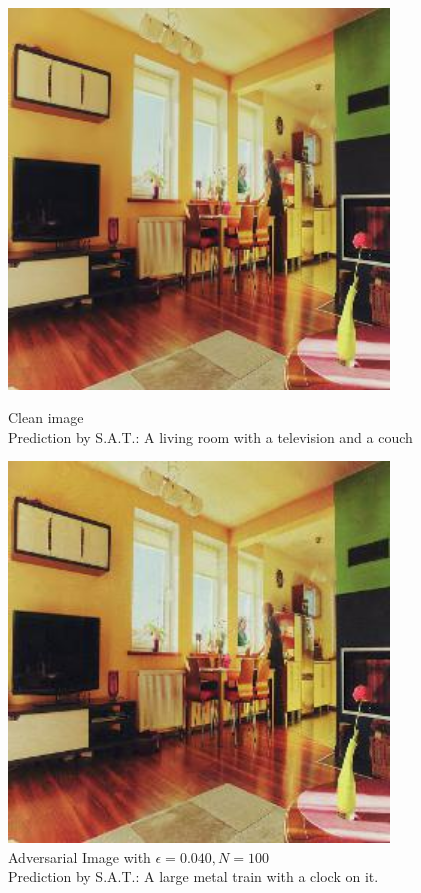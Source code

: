 \begin{figure}[ht]
    \centering
    \begin{minipage}{0.45\textwidth}
        \centering
        \includegraphics[width=0.9\textwidth]{figures/Distract/n=100/samples/0.000/img_0.jpg} %
        \caption*{Clean image\\Prediction by S.A.T.: A living room with a television and a couch}
    \end{minipage}\hfill
    \begin{minipage}{0.45\textwidth}
        \centering
        \includegraphics[width=0.9\textwidth]{figures/Distract/n=100/samples/0.040/img_0.jpg} %
        \caption*{Adversarial Image with $\epsilon=0.040, N=100$\\Prediction by S.A.T.: A large metal train with a clock on it.}
    \end{minipage}
\end{figure}

